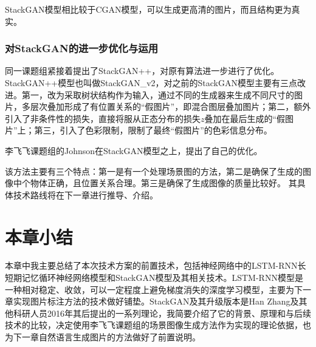   StackGAN模型相比较于CGAN模型，可以生成更高清的图片，而且结构更为真实。

\subsubsection{对StackGAN的进一步优化与运用}
同一课题组紧接着提出了StackGAN++，对原有算法进一步进行了优化。StackGAN++模型也叫做StackGAN\_v2，对之前的StackGAN模型主要有三点改进。第一，改为采取树状结构作为输入，通过不同的生成器来生成不同尺寸的图片，多层次叠加形成了有位置关系的“假图片”，即混合图层叠加图片；第二，额外引入了非条件性的损失，直接将服从正态分布的损失$z$叠加在最后生成的“假图片”上；第三，引入了色彩限制，限制了最终“假图片”的色彩信息分布。

李飞飞课题组的Johnson在StackGAN模型之上，提出了自己的优化。

该方法主要有三个特点：第一是有一个处理场景图的方法，第二是确保了生成的图像中个物体正确，且位置关系合理。第三是确保了生成图像的质量比较好。
其具体技术路线将在下一章进行推导、介绍。

\section{本章小结}
本章中我主要总结了本次技术方案的前置技术，包括神经网络中的LSTM-RNN长短期记忆循环神经网络模型和StackGAN模型及其相关技术。LSTM-RNN模型是一种相对稳定、收敛，可以一定程度上避免梯度消失的深度学习模型，主要为下一章实现图片标注方法的技术做好铺垫。StackGAN及其升级版本是Han Zhang及其他科研人员2016年其后提出的一系列理论，我简要介绍了它的背景、原理和与后续技术的比较，决定使用李飞飞课题组的场景图像生成方法作为实现的理论依据，也为下一章自然语言生成图片的方法做好了前置说明。